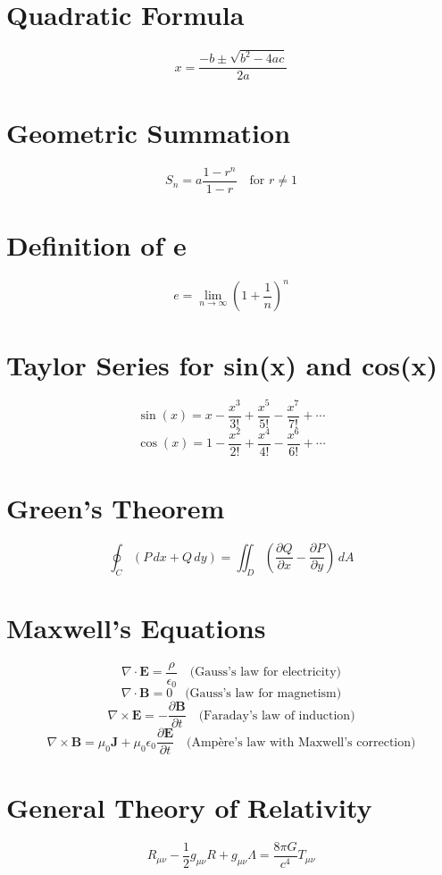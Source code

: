 \documentclass[a5paper, 10pt, openany]{book} %
\begin{document}
\section*{Quadratic Formula}
\[
x = \frac{-b \pm \sqrt{b^2 - 4ac}}{2a}
\]

\section*{Geometric Summation}
\[
S_n = a \frac{1 - r^n}{1 - r} \quad \text{for } r \neq 1
\]

\section*{Definition of e}
\[
e = \lim_{n \to \infty} \left(1 + \frac{1}{n}\right)^n
\]

\section*{Taylor Series for sin(x) and cos(x)}
\[
\sin(x) = x - \frac{x^3}{3!} + \frac{x^5}{5!} - \frac{x^7}{7!} + \cdots
\]
\[
\cos(x) = 1 - \frac{x^2}{2!} + \frac{x^4}{4!} - \frac{x^6}{6!} + \cdots
\]

\section*{Green's Theorem}
\[
\oint_C \left( P \, dx + Q \, dy \right) = \iint_D \left( \frac{\partial Q}{\partial x} - \frac{\partial P}{\partial y} \right) \, dA
\]

\section*{Maxwell's Equations}
\[
\nabla \cdot \mathbf{E} = \frac{\rho}{\epsilon_0} \quad \text{(Gauss's law for electricity)}
\]
\[
\nabla \cdot \mathbf{B} = 0 \quad \text{(Gauss's law for magnetism)}
\]
\[
\nabla \times \mathbf{E} = -\frac{\partial \mathbf{B}}{\partial t} \quad \text{(Faraday's law of induction)}
\]
\[
\nabla \times \mathbf{B} = \mu_0 \mathbf{J} + \mu_0 \epsilon_0 \frac{\partial \mathbf{E}}{\partial t} \quad \text{(Ampère's law with Maxwell's correction)}
\]

\section*{General Theory of Relativity}
\[
R_{\mu\nu} - \frac{1}{2} g_{\mu\nu} R + g_{\mu\nu} \Lambda = \frac{8 \pi G}{c^4} T_{\mu\nu}
\]
\end{document}
